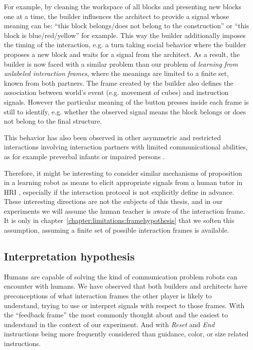 For example, by cleaning the workspace of all blocks and presenting new blocks one at a time, the builder influences the architect to provide a signal whose meaning can be: ``this block belongs/does not belong to the construction'' or ``this block is blue/red/yellow'' for example. This way the builder additionally imposes the timing of the interaction, e.g. a turn taking social behavior where the builder proposes a new block and waits for a signal from the architect. As a result, the builder is now faced with a similar problem than our problem of \emph{learning from unlabeled interaction frames}, where the meanings are limited to a finite set, known from both partners. The frame created by the builder also defines the association between world's event (e.g. movement of cubes) and instruction signals. However the particular meaning of the button presses inside each frame is still to identify, e.g. whether the observed signal means the block belongs or does not belong to the final structure.

This behavior has also been observed in other asymmetric and restricted interactions involving interaction partners with limited communicational abilities, as for example preverbal infants or impaired persons \cite{ochs1979propositions, goodwin1995co}. 

Therefore, it might be interesting to consider similar mechanisms of proposition in a learning robot as means to elicit appropriate signals from a human tutor in HRI \cite{cakmak2012designing,vollmer2014robots,cangelosi2010integration}, especially if the interaction protocol is not explicitly define in advance. These interesting directions are not the subjects of this thesis, and in our experiments we will assume the human teacher is aware of the interaction frame. It is only in chapter~\ref{chapter:limitations:framehypothesis} that we soften this assumption, assuming a finite set of possible interaction frames is available.

\subsection{Interpretation hypothesis}
\label{chapter:humanexperiment:interpretationhypothesis}

Humans are capable of solving the kind of communication problem robots can encounter with humans. We have observed that both builders and architects have preconceptions of what interaction frames the other player is likely to understand, trying to use or interpret signals with respect to those frames. With the ``feedback frame'' the most commonly thought about and the easiest to understand in the context of our experiment. And with \emph{Reset} and \emph{End} instructions being more frequently considered than guidance, color, or size related instructions.


